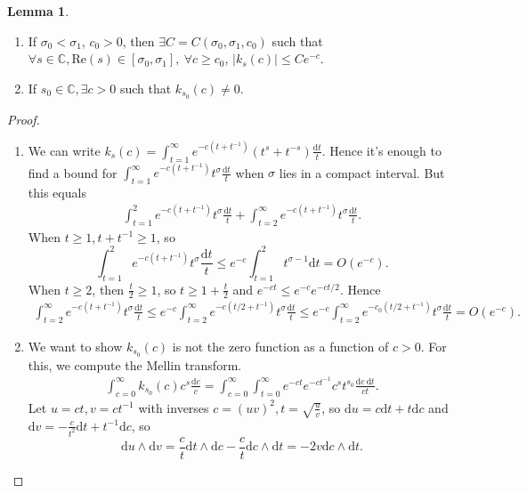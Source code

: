 \documentclass{article}
\theoremstyle{definition}
\newtheorem{lemma}[theorem]{Lemma}
\begin{document}
\begin{lemma}\label{lemma6.5}
    \begin{enumerate}[(1)]
        \item If $\sigma_0<\sigma_1$, $c_0>0$, then $\exists C=C(\sigma_0,\sigma_1,c_0)$ such that $\forall s \in \mathbb{C}, \text{Re}(s) \in [\sigma_0,\sigma_1], ~\forall c \ge c_0$, $|k_s(c)|\le Ce^{-c}$. 
        \item If $s_0 \in \mathbb{C}, \exists c>0$ such that $k_{s_0}(c) \neq 0$.
    \end{enumerate}
\end{lemma}
\begin{proof}
    \begin{enumerate}[(1)]
        \item We can write $k_s(c) = \int_{t=1}^{\infty} e^{-c(t + t^{-1})}(t^s+t^{-s})\frac{\mathrm{d}t}{t}$. Hence it's enough to find a bound for $\int_{t=1}^{\infty} e^{-c(t+t^{-1})}t^{\sigma}\frac{\mathrm{d}t}{t}$ when $\sigma$ lies in a compact interval. But this equals
        \begin{align*}
            \int_{t=1}^{2} e^{-c(t+t^{-1})}t^{\sigma}\frac{\mathrm{d}t}{t} + \int_{t=2}^{\infty} e^{-c(t+t^{-1})}t^{\sigma}\frac{\mathrm{d}t}{t}.
        \end{align*}
        When $t\ge 1, t+ t^{-1} \ge 1$, so $$\int_{t=1}^{2} e^{-c(t + t^{-1})}t^{\sigma}\frac{\mathrm{d}t}{t}\le e^{-c}\int_{t=1}^{2} t^{\sigma-1}\mathrm{d}t  = O(e^{-c}).$$
        When $t\ge 2$, then $\frac{t}{2}\ge 1$, so $t \ge 1 + \frac{t}{2}$ and $e^{-ct} \le e^{-c}e^{-ct/2}$. Hence 
        \begin{align*}
            \int_{t=2}^{\infty} e^{-c(t+t^{-1})}t^{\sigma}\frac{\mathrm{d}t}{t}\le e^{-c}\int_{t=2}^{\infty} e^{-c(t/2+t^{-1})}t^{\sigma}\frac{\mathrm{d}t}{t} \le e^{-c}\int_{t=2}^{\infty} e^{-c_0(t/2 + t^{-1})}t^{\sigma}\frac{\mathrm{d}t}{t} = O(e^{-c}).
        \end{align*}
        \item We want to show $k_{s_0}(c)$ is not the zero function as a function of $c>0$. For this, we compute the Mellin transform.
        \begin{align*}
            \int_{c=0}^{\infty} k_{s_0}(c)c^s\frac{\mathrm{d}c}{c} = \int_{c=0}^{\infty} \int_{t=0}^{\infty} e^{-ct}e^{-ct^{-1}}c^st^{s_0}\frac{\mathrm{d}c~\mathrm{d}t}{ct}.
        \end{align*}
        Let $u = ct, v = ct^{-1}$ with inverses $c = (uv)^2, t = \sqrt{\frac{u}{v}}$, so $\mathrm{d}u = c \mathrm{d}t + t \mathrm{d}c$ and $\mathrm{d}v = -\frac{c}{t^2}\mathrm{d}t + t^{-1}\mathrm{d}c$, so $$\mathrm{d}u \wedge \mathrm{d}v = \frac{c}{t}\mathrm{d}t \wedge \mathrm{d}c - \frac{c}{t}\mathrm{d}c \wedge \mathrm{d}t = - 2v \mathrm{d}c \wedge \mathrm{d}t.$$

\end{enumerate}
\end{proof}
\end{document}
